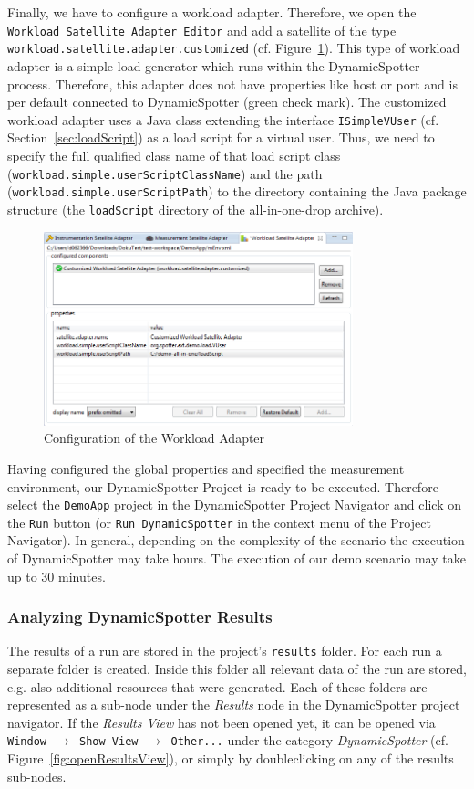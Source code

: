 \documentclass{report}
\newcommand{\DS}{DynamicSpotter }
\begin{document}
Finally, we have to configure a workload adapter. Therefore, we open the \texttt{Workload Satellite Adapter Editor} and
add a satellite of the type \texttt{workload.satellite.adapter.customized} (cf. Figure~\ref{fig:workloadConfig}). This
type of workload adapter is a simple load generator which runs within the \DS process. Therefore, this adapter does not have properties like host or port and
is per default connected to \DS (green check mark). The customized workload adapter uses a Java class extending the
interface \texttt{ISimpleVUser} (cf. Section~\ref{sec:loadScript}) as a load script for a virtual user. Thus, we need to
specify the full qualified class name of that load script class (\texttt{workload.simple.userScriptClassName}) and the
path (\texttt{workload.simple.userScriptPath}) to the directory containing the Java package structure (the
\texttt{loadScript} directory of the all-in-one-drop archive).

\begin{figure}[h]
\centering
\includegraphics[width=0.8\textwidth]{figures/demo/0012-workloadConfig.png}
\caption{Configuration of the Workload Adapter}
\label{fig:workloadConfig}
\end{figure}

Having configured the global properties and specified the measurement environment, our \DS Project is ready to be
executed. Therefore select the \texttt{DemoApp} project in the \DS Project Navigator and click on the \texttt{Run}
button (or \texttt{Run DynamicSpotter} in the context menu of the Project Navigator).
In general, depending on the complexity of the scenario the execution of \DS may take hours. The execution of our demo
scenario may take up to 30 minutes. 

\subsubsection{Analyzing \DS Results}
The results of a run are stored in the project's \texttt{results} folder. For each run a separate folder is created. Inside this folder all relevant data of the run are stored, e.g. also additional resources that were generated.
Each of these folders are represented as a sub-node under the \emph{Results} node in the \DS project navigator. If the \emph{Results View} has not been opened yet, it can be opened via \texttt{Window \(\rightarrow\) Show View \(\rightarrow\) Other...} under the category \emph{\DS} (cf. Figure~\ref{fig:openResultsView}), or simply by doubleclicking on any of the results sub-nodes.
\end{document}
